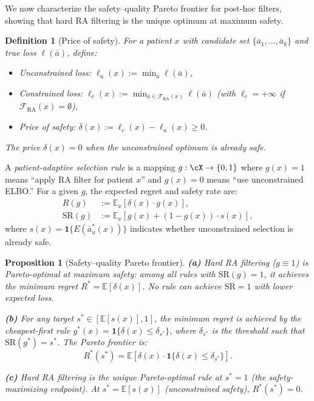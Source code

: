 \documentclass{article}
\newtheorem{proposition}[theorem]{Proposition}
\newtheorem{definition}{Definition}
\newcommand{\E}{\mathbb{E}}
\newcommand{\ba}{\bar{a}}
\newcommand{\cF}{\mathcal{F}}
\newcommand{\ind}{\mathbf{1}}
\begin{document}
We now characterize the safety--quality Pareto frontier for post-hoc filters, showing that hard RA filtering is the unique optimum at maximum safety.

\begin{definition}[Price of safety]
\label{def:price_of_safety}
For a patient $x$ with candidate set $\{\ba_1, \ldots, \ba_k\}$ and true loss $\ell(\ba)$, define:
\begin{itemize}[leftmargin=*,topsep=2pt,itemsep=1pt]
\item Unconstrained loss: $\ell_u(x) := \min_{\ba} \ell(\ba)$,
\item Constrained loss: $\ell_c(x) := \min_{\ba \in \cF_{\mathrm{RA}}(x)} \ell(\ba)$ (with $\ell_c = +\infty$ if $\cF_{\mathrm{RA}}(x) = \emptyset$),
\item \emph{Price of safety}: $\delta(x) := \ell_c(x) - \ell_u(x) \geq 0$.
\end{itemize}
The price $\delta(x) = 0$ when the unconstrained optimum is already safe.
\end{definition}

A \emph{patient-adaptive selection rule} is a mapping $g: \cX \to \{0, 1\}$ where $g(x) = 1$ means ``apply RA filter for patient $x$'' and $g(x) = 0$ means ``use unconstrained ELBO.'' For a given $g$, the expected regret and safety rate are:
\begin{align}
R(g) &:= \E_x[\delta(x) \cdot g(x)], \label{eq:regret_g} \\
\mathrm{SR}(g) &:= \E_x[g(x) + (1 - g(x)) \cdot s(x)], \label{eq:sr_g}
\end{align}
where $s(x) = \ind\{E(\ba^*_u(x))\}$ indicates whether unconstrained selection is already safe.

\begin{proposition}[Safety--quality Pareto frontier]
\label{prop:pareto}
\textbf{(a)} Hard RA filtering ($g \equiv 1$) is Pareto-optimal at maximum safety: among all rules with $\mathrm{SR}(g) = 1$, it achieves the minimum regret $R^* = \E[\delta(x)]$. No rule can achieve $\mathrm{SR} = 1$ with lower expected loss.

\textbf{(b)} For any target $s^* \in [\E[s(x)], 1]$, the minimum regret is achieved by the \emph{cheapest-first} rule $g^*(x) = \ind\{\delta(x) \leq \delta_{s^*}\}$, where $\delta_{s^*}$ is the threshold such that $\mathrm{SR}(g^*) = s^*$. The Pareto frontier is:
\begin{equation}
\label{eq:pareto_frontier}
R^*(s^*) = \E[\delta(x) \cdot \ind\{\delta(x) \leq \delta_{s^*}\}].
\end{equation}

\textbf{(c)} Hard RA filtering is the unique Pareto-optimal rule at $s^* = 1$ (the safety-maximizing endpoint). At $s^* = \E[s(x)]$ (unconstrained safety), $R^*(s^*) = 0$.
\end{proposition}
\end{document}
